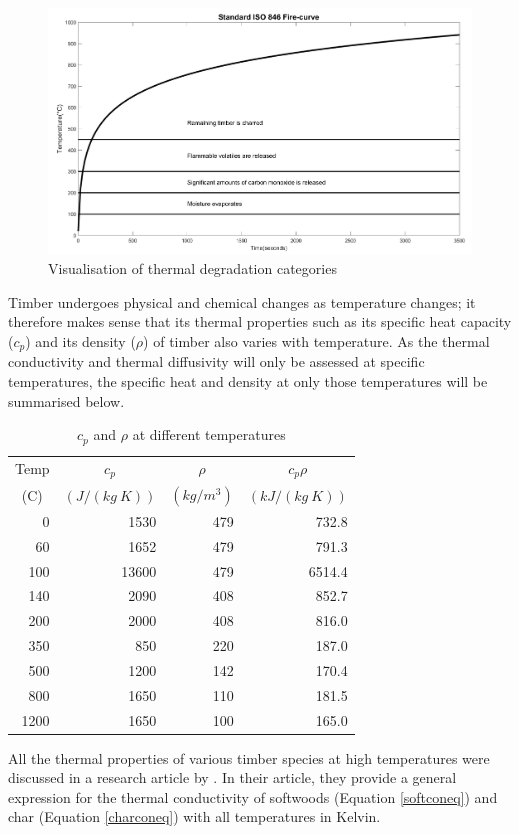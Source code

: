 \begin{figure}
\centering
\includegraphics[width = \textwidth]{figures/iso_phases.png}
\caption{Visualisation of thermal degradation categories}
\label{fig:iso_phases}
\end{figure}

Timber undergoes physical and chemical changes as temperature changes; it therefore makes sense that its thermal properties such as its specific heat capacity  ($c_p$) and its density  ($\rho$) of timber also varies with temperature.
As the thermal conductivity and thermal diffusivity will only be assessed at specific temperatures, the specific heat and density  at only those temperatures will be summarised below.
\begin{table}
\centering
\caption{$c_p$ and $\rho$ at different temperatures}
\label{cptab}
	\begin{tabular}{ r r r r }
	\toprule
	\multicolumn{1}{c}{Temp}& \multicolumn{1}{c}{$c_p$}& \multicolumn{1}{c}{$\rho$} & \multicolumn{1}{c}{$c_p\rho$}\\
	\multicolumn{1}{c}{ (\textdegree C)} & \multicolumn{1}{c}{$ (J/ (kg\ K))$} &  \multicolumn{1}{c}{$ (kg/m^3)$} & \multicolumn{1}{c}{$ (kJ/ (kg\ K))$}\\
	\midrule
	0   & 1530 & 479&732.8\\
	60  &1652	& 479&791.3\\
	100 &13600& 479&6514.4\\
 	140 &2090 &408&852.7\\
	200 & 2000&408&816.0\\
	350 & 850 &220&187.0\\
	500 & 1200 &142&170.4\\
	800 & 1650&110&181.5\\
	1200& 1650 &100&165.0\\
	\bottomrule
	\end{tabular}
	
\end{table}
All the thermal properties of various timber species at high temperatures were discussed in a research article by \citet{Shi:2021}.
 In their article, they provide a general expression for the thermal conductivity of softwoods  (Equation \ref{softconeq}) and char  (Equation \ref{charconeq}) with all temperatures in Kelvin.


